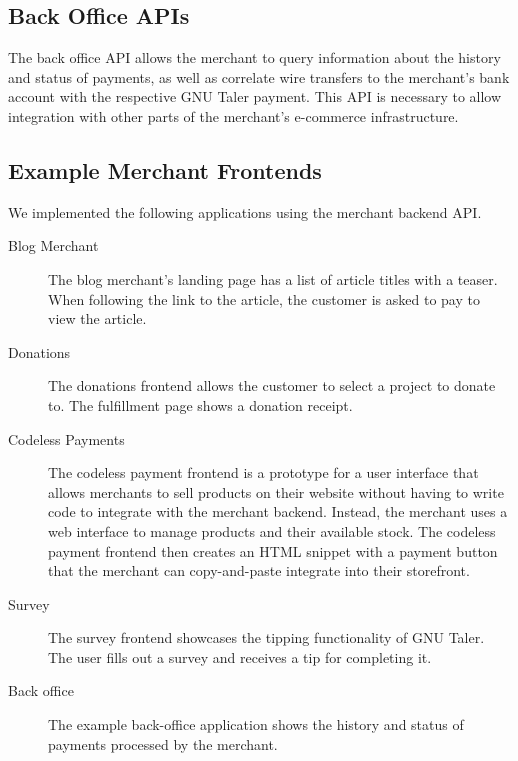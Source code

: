 \subsection{Back Office APIs}

The back office API allows the merchant to query information about the history
and status of payments, as well as correlate wire transfers to the merchant's
bank account with the respective GNU Taler payment.  This API is necessary to
allow integration with other parts of the merchant's e-commerce infrastructure.


\subsection{Example Merchant Frontends}

We implemented the following applications using the merchant backend API.

\begin{description}
  \item[Blog Merchant] The blog merchant's landing page has a list of article titles with a teaser.
    When following the link to the article, the customer is asked to pay to view the article.
  \item[Donations]  The donations frontend allows the customer to select a project to donate to.
    The fulfillment page shows a donation receipt.
  \item[Codeless Payments]  The codeless payment frontend is a prototype for a
    user interface that allows merchants to sell products on their website
    without having to write code to integrate with the merchant backend.
    Instead, the merchant uses a web interface to manage products and their
    available stock.  The codeless payment frontend then creates an HTML snippet with a payment
    button that the merchant can copy-and-paste integrate into their storefront.
  \item[Survey]  The survey frontend showcases the tipping functionality of GNU Taler.
    The user fills out a survey and receives a tip for completing it.
  \item[Back office] The example back-office application shows the history and
    status of payments processed by the merchant.
\end{description}

